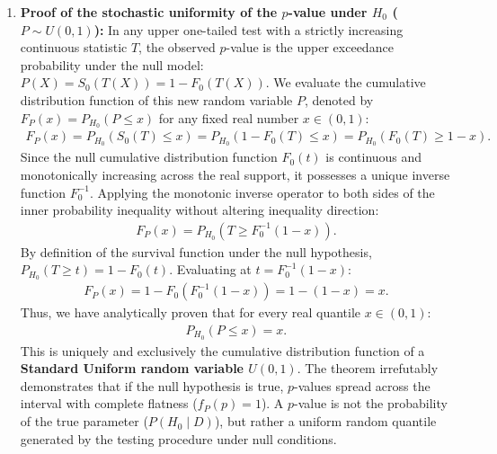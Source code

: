 \begin{solproblema}
	\begin{enumerate}
		\item \textbf{Proof of the stochastic uniformity of the $p$-value under $H_0$ ($P \sim U(0,1)$):}
		In any upper one-tailed test with a strictly increasing continuous statistic $T$, the observed $p$-value is the upper exceedance probability under the null model: $P(X) = S_0(T(X)) = 1 - F_0(T(X))$.
		We evaluate the cumulative distribution function of this new random variable $P$, denoted by $F_P(x) = P_{H_0}(P \le x)$ for any fixed real number $x \in (0,1)$:
		\begin{align}
			F_P(x) = P_{H_0}\left( S_0(T) \le x \right) = P_{H_0}\left( 1 - F_0(T) \le x \right) = P_{H_0}\left( F_0(T) \ge 1 - x \right).
		\end{align}
		Since the null cumulative distribution function $F_0(t)$ is continuous and monotonically increasing across the real support, it possesses a unique inverse function $F_0^{-1}$. Applying the monotonic inverse operator to both sides of the inner probability inequality without altering inequality direction:
		\begin{align}
			F_P(x) = P_{H_0}\left( T \ge F_0^{-1}(1 - x) \right).
		\end{align}
		By definition of the survival function under the null hypothesis, $P_{H_0}(T \ge t) = 1 - F_0(t)$. Evaluating at $t = F_0^{-1}(1 - x)$:
		\begin{align}
			F_P(x) = 1 - F_0\left( F_0^{-1}(1 - x) \right) = 1 - (1 - x) = x.
		\end{align}
		Thus, we have analytically proven that for every real quantile $x \in (0,1)$:
		\begin{align}
			P_{H_0}(P \le x) = x.
		\end{align}
		This is uniquely and exclusively the cumulative distribution function of a \textbf{Standard Uniform random variable $U(0,1)$}. The theorem irrefutably demonstrates that if the null hypothesis is true, $p$-values spread across the interval with complete flatness ($f_P(p) = 1$). A $p$-value is not the probability of the true parameter ($P(H_0 \mid D)$), but rather a uniform random quantile generated by the testing procedure under null conditions.
		

\end{enumerate}
\end{solproblema}

